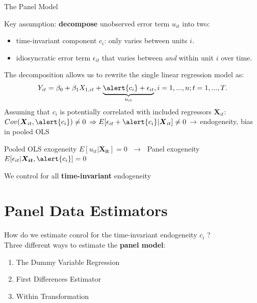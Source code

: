 \documentclass[9pt,aspectratio=169]{beamer}
\begin{document}
\begin{frame}{The Panel Model}

Key assumption: \textbf{decompose} unobserved error term $u_{it}$ into two:
\begin{itemize}
    \item time-invariant component \alert{$c_i$}: only varies between units $i$.
    \item idiosyncratic error term $\epsilon_{it}$ that varies between \textit{and} within unit $i$ over time.
\end{itemize}
\pause
The decomposition allows us to rewrite the single linear regression model as:
\begin{align*}
       Y_{it} = \beta_0 + \beta_1 X_{1,it} + \underbrace{\alert{c_i} + \epsilon_{it}}_{u_{it}} , i = 1, ... , n; t = 1, ... , T. 
\end{align*}
\pause 
Assuming that \alert{\textbf{$c_i$}} is potentially correlated with included regressors $\boldsymbol{X}_{it}$:  $Cov(\boldsymbol{X}_{it},\alert{c_i}) \neq 0 \: \Rightarrow E[\epsilon_{it}+\alert{c_i}|\boldsymbol{X}_{it}] \neq 0 \: \rightarrow$ endogeneity, bias in pooled OLS
\pause
\begin{center}
    Pooled OLS exogeneity $E[u_{it}|\boldsymbol{X_{it}}] = 0$ 
    $\; \rightarrow \;$ \pause Panel exogeneity $E[\epsilon_{it}|\boldsymbol{X_{it}}, \alert{c_i}] = 0$
\end{center}
\pause
\begin{center}
    We control for all \textbf{time-invariant} endogeneity
\end{center}
\end{frame}

\section{Panel Data Estimators}

\begin{frame}
    How do we estimate conrol for the time-invariant endogeneity \alert{$c_i$} ? \\ \pause 
    Three different ways to estimate the \textbf{panel model}:
    \begin{enumerate}
        \item The Dummy Variable Regression
        \item First Differences Estimator
        \item Within Transformation
    \end{enumerate}
\end{frame}
\end{document}
